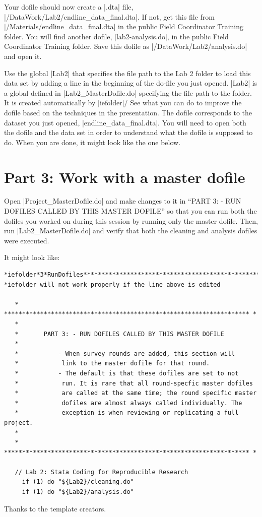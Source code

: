 \documentclass{tufte-handout}
\begin{document}
Your dofile should now create a |.dta| file,
|/DataWork/Lab2/endline_data_final.dta|.
If not, get this file from |/Materials/endline_data_final.dta|
in the public Field Coordinator Training folder.
You will find another dofile, |lab2-analysis.do|,
in the public Field Coordinator Training folder.
Save this dofile as |/DataWork/Lab2/analysis.do| and open it.

Use the global |Lab2| that specifies the file path
to the Lab 2 folder to load this data set
by adding a line in the beginning of the do-file you just opened.
|Lab2| is a global defined in |Lab2_MasterDofile.do|
specifying the file path to the folder.
It is created automatically by |iefolder|/
See what you can do to improve the dofile
based on the techniques in the presentation.
The dofile corresponds to the dataset you just opened,
|endline_data_final.dta|.
You will need to open both the dofile and the data set
in order to understand what the dofile is supposed to do.
When you are done, it might look like the one below.


\begin{figure}[h]
{
}
\end{figure}

\section{Part 3: Work with a master dofile}

Open |Project_MasterDofile.do| and make changes to it
in ``PART 3: - RUN DOFILES CALLED BY THIS MASTER DOFILE''
so that you can run both the dofiles you worked on during this session
by running only the master dofile.
Then, run |Lab2_MasterDofile.do| and verify
that both the cleaning and analysis dofiles were executed.

It might look like:

\begin{Verbatim}
*iefolder*3*RunDofiles**********************************************************
*iefolder will not work properly if the line above is edited

   * ******************************************************************** *
   *
   *       PART 3: - RUN DOFILES CALLED BY THIS MASTER DOFILE
   *
   *           - When survey rounds are added, this section will
   *            link to the master dofile for that round.
   *           - The default is that these dofiles are set to not
   *            run. It is rare that all round-specfic master dofiles
   *            are called at the same time; the round specific master
   *            dofiles are almost always called individually. The
   *            exception is when reviewing or replicating a full project.
   *
   * ******************************************************************** *

   // Lab 2: Stata Coding for Reproducible Research
     if (1) do "${Lab2}/cleaning.do"
     if (1) do "${Lab2}/analysis.do"
\end{Verbatim}

Thanks to the template creators.\cite{tuftelatex}



\end{document}
